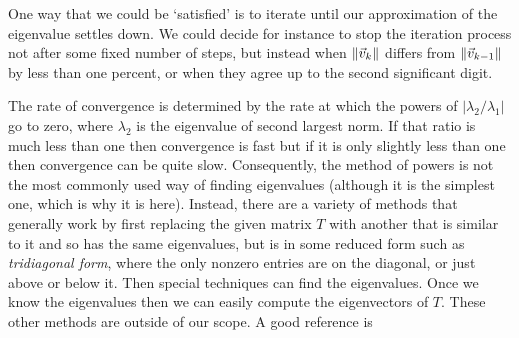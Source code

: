 One way that we could be `satisfied'
is to iterate until our approximation of the eigenvalue settles down.
We could decide for instance to stop the iteration
process not after some fixed number of steps, but instead
when $\|\vec{v}_k\|$ differs from $\|\vec{v}_{k-1}\|$ 
by less than one percent, or when they agree up to the 
second significant digit. 

The rate of convergence is determined by the rate at which 
the powers of $|\lambda_2/\lambda_1|$ go to zero,
where $\lambda_2$ is the eigenvalue of second largest norm. 
If that ratio is much less than one then convergence is fast but
if it is only slightly less than one then convergence can be quite slow.
Consequently, the method of powers
is not the most commonly used way of finding eigenvalues
(although it is the simplest one, which is why it is here).
Instead, there are a variety of methods that generally work by first 
replacing the given matrix $T$ with another that is similar to it
and so has the same eigenvalues, but is in some reduced form
such as 
\emph{tridiagonal form},
where the only nonzero
entries are on the diagonal, or just above or below it.
Then special techniques can find the eigenvalues.
Once we know the eigenvalues then we can easily compute 
the eigenvectors of $T$. 
These other methods are outside of our scope.
A good reference is \cite{Goult}



